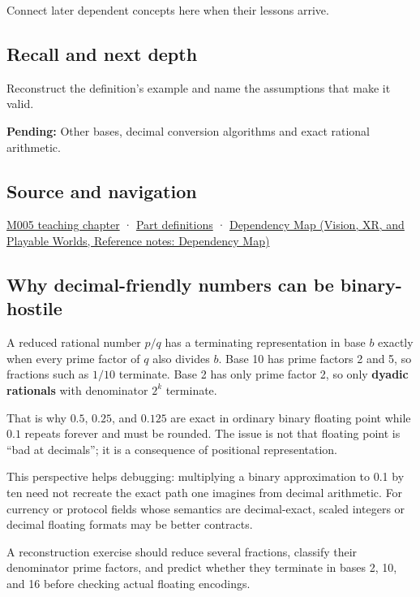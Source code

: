 \hypertarget{appendix-2a2f1b74bdd3-used-by}{}

Connect later dependent concepts here when their lessons arrive.

\subsection{Recall and next depth}\label{appendix-2a2f1b74bdd3-recall-and-next-depth}

\hypertarget{appendix-2a2f1b74bdd3-recall-and-next-depth}{}

Reconstruct the definition's example and name the assumptions that make it valid.

\textbf{Pending:} Other bases, decimal conversion algorithms and exact rational arithmetic.

\subsection{Source and navigation}\label{appendix-2a2f1b74bdd3-source-and-navigation}

\hypertarget{appendix-2a2f1b74bdd3-source-and-navigation}{}

\hyperref[01-foundations-i-ch001-when-arithmetic-meets-uncertainty]{M005 teaching chapter} · \hyperref[appendix-fd090d982a15-m005---parts-77-88]{Part definitions} · \href{../07-Vision-XR-and-Playable-Worlds/main.pdf\#nameddest=appendix-4ad47bdd269a}{Dependency Map (Vision, XR, and Playable Worlds, Reference notes: Dependency Map)}

\subsection{Why decimal-friendly numbers can be binary-hostile}\label{appendix-2a2f1b74bdd3-why-decimal-friendly-numbers-can-be-binary-hostile}

\hypertarget{appendix-2a2f1b74bdd3-why-decimal-friendly-numbers-can-be-binary-hostile}{}

A reduced rational number \(p/q\) has a terminating representation in base \(b\) exactly when every prime factor of \(q\) also divides \(b\). Base 10 has prime factors 2 and 5, so fractions such as \(1/10\) terminate. Base 2 has only prime factor 2, so only \textbf{dyadic rationals} with denominator \(2^k\) terminate.

That is why \(0.5\), \(0.25\), and \(0.125\) are exact in ordinary binary floating point while \(0.1\) repeats forever and must be rounded. The issue is not that floating point is ``bad at decimals''; it is a consequence of positional representation.

This perspective helps debugging: multiplying a binary approximation to 0.1 by ten need not recreate the exact path one imagines from decimal arithmetic. For currency or protocol fields whose semantics are decimal-exact, scaled integers or decimal floating formats may be better contracts.

A reconstruction exercise should reduce several fractions, classify their denominator prime factors, and predict whether they terminate in bases 2, 10, and 16 before checking actual floating encodings.

